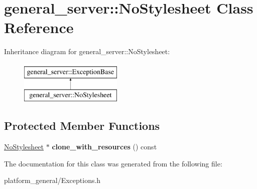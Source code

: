 \hypertarget{classgeneral__server_1_1NoStylesheet}{\section{general\-\_\-server\-:\-:\-No\-Stylesheet \-Class \-Reference}
\label{classgeneral__server_1_1NoStylesheet}
}
\-Inheritance diagram for general\-\_\-server\-:\-:\-No\-Stylesheet\-:\begin{figure}[H]
\begin{center}
\leavevmode
\includegraphics[height=2.000000cm]{classgeneral__server_1_1NoStylesheet}
\end{center}
\end{figure}
\subsection*{\-Protected \-Member \-Functions}
\begin{DoxyCompactItemize}
\item 
\hypertarget{classgeneral__server_1_1NoStylesheet_a3ed51dd9feb673305c52e1a9ca24c4b2}{\hyperlink{classgeneral__server_1_1NoStylesheet}{\-No\-Stylesheet} $\ast$ {\bfseries clone\-\_\-with\-\_\-resources} () const }\label{classgeneral__server_1_1NoStylesheet_a3ed51dd9feb673305c52e1a9ca24c4b2}

\end{DoxyCompactItemize}


\-The documentation for this class was generated from the following file\-:\begin{DoxyCompactItemize}
\item 
platform\-\_\-general/\-Exceptions.\-h\end{DoxyCompactItemize}
